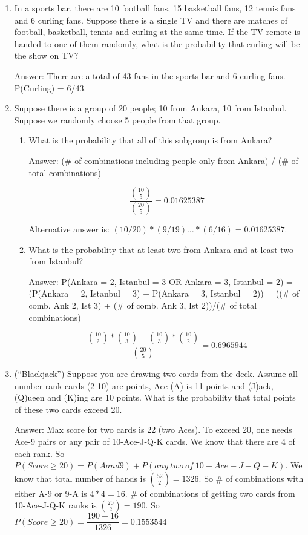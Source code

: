 \documentclass[]{book}
\theoremstyle{definition}
\theoremstyle{definition}
\theoremstyle{definition}
\theoremstyle{remark}
\begin{document}
\begin{enumerate}
\def\labelenumi{\arabic{enumi}.}
\item
  In a sports bar, there are 10 football fans, 15 basketball fans, 12
  tennis fans and 6 curling fans. Suppose there is a single TV and there
  are matches of football, basketball, tennis and curling at the same
  time. If the TV remote is handed to one of them randomly, what is the
  probability that curling will be the show on TV?

  Answer: There are a total of 43 fans in the sports bar and 6 curling
  fans. P(Curling) = 6/43.
\item
  Suppose there is a group of 20 people; 10 from Ankara, 10 from
  Istanbul. Suppose we randomly choose 5 people from that group.

  \begin{enumerate}
  \def\labelenumii{\alph{enumii}.}
  \item
    What is the probability that all of this subgroup is from Ankara?

    Answer: (\# of combinations including people only from Ankara) / (\#
    of total combinations)

    \[\dfrac{\binom{10}{5}}{\binom{20}{5}} = 0.01625387\]

    Alternative answer is:
    \((10/20)*(9/19)\dots * (6/16) = 0.01625387\).
  \item
    What is the probability that at least two from Ankara and at least
    two from Istanbul?

    Answer: P(Ankara = 2, Istanbul = 3 OR Ankara = 3, Istanbul = 2) =
    (P(Ankara = 2, Istanbul = 3) + P(Ankara = 3, Istanbul = 2)) = ((\#
    of comb. Ank 2, Ist 3) + (\# of comb. Ank 3, Ist 2))/(\# of total
    combinations)

    \[\dfrac{\binom{10}{2}*\binom{10}{3} + \binom{10}{3}*\binom{10}{2}}{\binom{20}{5}} = 0.6965944\]
  \end{enumerate}
\item
  (``Blackjack'') Suppose you are drawing two cards from the deck.
  Assume all number rank cards (2-10) are points, Ace (A) is 11 points
  and (J)ack, (Q)ueen and (K)ing are 10 points. What is the probability
  that total points of these two cards exceed 20.

  Answer: Max score for two cards is 22 (two Aces). To exceed 20, one
  needs Ace-9 pairs or any pair of 10-Ace-J-Q-K cards. We know that
  there are 4 of each rank. So
  \(P(Score \ge 20) = P(A and 9) + P(any\ two\ of\ 10-Ace-J-Q-K)\). We
  know that total number of hands is \(\binom{52}{2} = 1326\). So \# of
  combinations with either A-9 or 9-A is \(4*4 = 16\). \# of
  combinations of getting two cards from 10-Ace-J-Q-K ranks is
  \(\binom{20}{2} = 190\). So
  \(P(Score \ge 20) = \dfrac{190 + 16}{1326} = 0.1553544\)


\end{enumerate}
\end{document}
